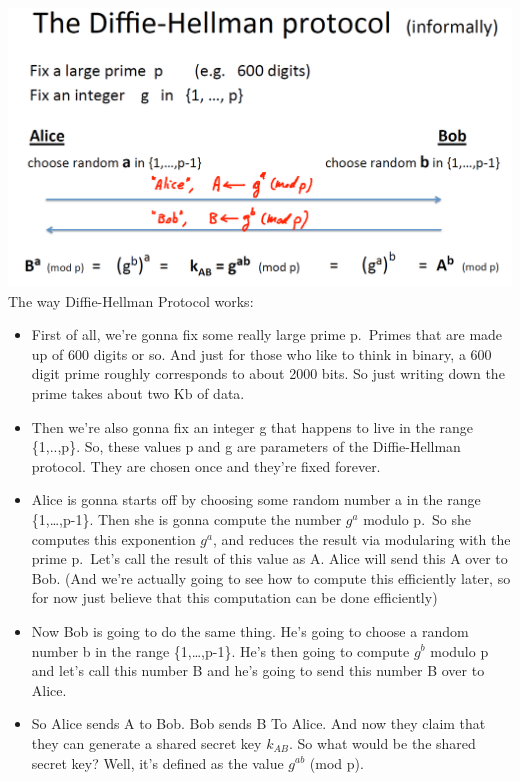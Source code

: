 \documentclass[11pt]{article}
\makeatletter
\def\maxwidth{\ifdim\Gin@nat@width>\linewidth\linewidth
    \else\Gin@nat@width\fi}
\let\Oldincludegraphics\includegraphics
\renewcommand{\includegraphics}[1]{\Oldincludegraphics[width=.8\maxwidth]{#1}}
\makeatother
\begin{document}
\includegraphics{./Images/DH-ProtocolInformal.png} The way
Diffie-Hellman Protocol works:

\begin{itemize}
\item
  First of all, we're gonna fix some really large prime p.~Primes that
  are made up of 600 digits or so. And just for those who like to think
  in binary, a 600 digit prime roughly corresponds to about 2000 bits.
  So just writing down the prime takes about two Kb of data.
\item
  Then we're also gonna fix an integer g that happens to live in the
  range \{1,..,p\}. So, these values p and g are parameters of the
  Diffie-Hellman protocol. They are chosen once and they're fixed
  forever. 
\item
  Alice is gonna starts off by choosing some random number a in the
  range \{1,\ldots{},p-1\}. Then she is gonna compute the number
  \(g^{a}\) modulo p.~So she computes this exponention \(g^{a}\), and
  reduces the result via modularing with the prime p.~Let's call the
  result of this value as A. Alice will send this A over to Bob. (And
  we're actually going to see how to compute this efficiently later, so
  for now just believe that this computation can be done efficiently) 
\item
  Now Bob is going to do the same thing. He's going to choose a random
  number b in the range \{1,\ldots{},p-1\}. He's then going to compute
  \(g^{b}\) modulo p and let's call this number B and he's going to send
  this number B over to Alice. 
\item
  So Alice sends A to Bob. Bob sends B To Alice. And now they claim that
  they can generate a shared secret key \(k_{AB}\). So what would be the
  shared secret key? Well, it's defined as the value \(g^{ab}\) (mod p).
\end{itemize}
\end{document}
